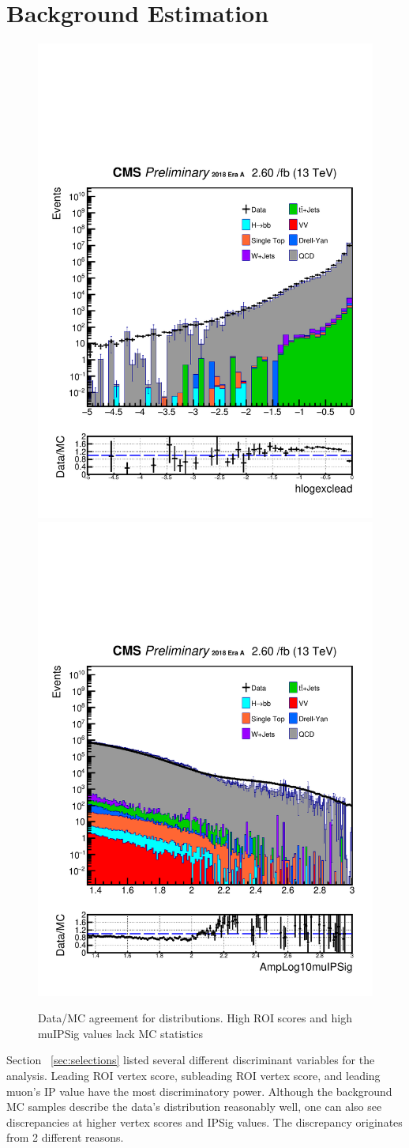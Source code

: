 \clearpage
\chapter{Background Estimation}\label{sec:estimate}

\begin{figure}[h!]
  \caption{Data/MC agreement for distributions. High ROI scores and high muIPSig values lack MC statistics}
  \label{fig:DataMCscore5}
  \centering
  \includegraphics[width=0.40\linewidth]{figs/Data_log_AnalysisNote_MS-15_ctauS-10_hlogexclead.pdf}
  \includegraphics[width=0.40\linewidth]{figs/Data_log_AnalysisNote_MS-15_ctauS-10_AmpLog10muIPSig.pdf}

\end{figure}
Section ~\ref{sec:selections} listed several different discriminant variables for the analysis.
Leading ROI vertex score, subleading ROI vertex score, and leading muon's IP value have the most discriminatory power.
Although the background MC samples describe the data's distribution reasonably well, one can also see discrepancies at higher vertex scores and IPSig values.
The discrepancy originates from 2 different reasons.

